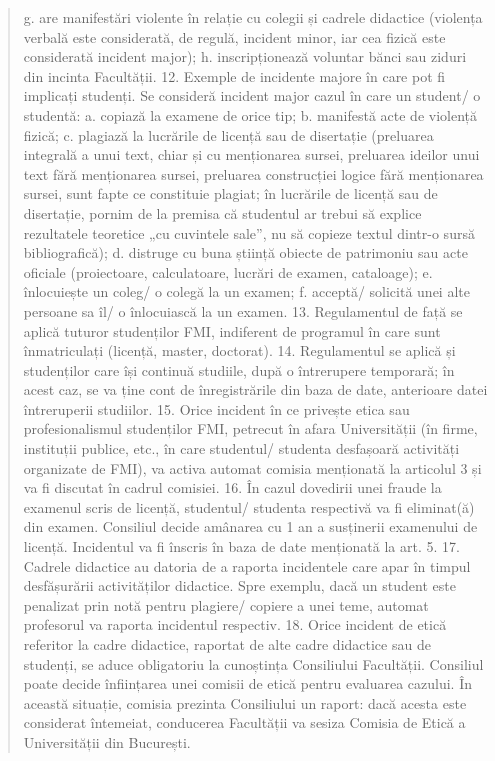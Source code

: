\documentclass{article}
\begin{document}
\begin{quote}
g. are manifestări violente în relație cu colegii și cadrele didactice (violența verbală este
considerată, de regulă, incident minor, iar cea fizică este considerată incident major);
h. inscripționează voluntar bănci sau ziduri din incinta Facultății.
12. Exemple de incidente majore în care pot fi implicați studenți.
Se consideră incident major cazul în care un student/ o studentă:
a. copiază la examene de orice tip;
b. manifestă acte de violență fizică;
c. plagiază la lucrările de licență sau de disertație (preluarea integrală a unui text, chiar
și cu menționarea sursei, preluarea ideilor unui text fără menționarea sursei,
preluarea construcției logice fără menționarea sursei, sunt fapte ce constituie plagiat;
în lucrările de licență sau de disertație, pornim de la premisa că studentul ar trebui să
explice rezultatele teoretice „cu cuvintele sale”, nu să copieze textul dintr-o sursă
bibliografică);
d. distruge cu buna știință obiecte de patrimoniu sau acte oficiale (proiectoare,
calculatoare, lucrări de examen, cataloage);
e. înlocuiește un coleg/ o colegă la un examen;
f. acceptă/ solicită unei alte persoane sa îl/ o înlocuiască la un examen.
13. Regulamentul de față se aplică tuturor studenților FMI, indiferent de programul în
care sunt înmatriculați (licență, master, doctorat).
14. Regulamentul se aplică și studenților care își continuă studiile, după o întrerupere
temporară; în acest caz, se va ține cont de înregistrările din baza de date, anterioare
datei întreruperii studiilor.
15. Orice incident în ce privește etica sau profesionalismul studenților FMI, petrecut în
afara Universității (în firme, instituții publice, etc., în care studentul/ studenta
desfașoară activități organizate de FMI), va activa automat comisia menționată la
articolul 3 și va fi discutat în cadrul comisiei.
16. În cazul dovedirii unei fraude la examenul scris de licență, studentul/ studenta
respectivă va fi eliminat(ă) din examen. Consiliul decide amânarea cu 1 an a
susținerii examenului de licență. Incidentul va fi înscris în baza de date menționată la
art. 5.
17. Cadrele didactice au datoria de a raporta incidentele care apar în timpul desfășurării
activităților didactice. Spre exemplu, dacă un student este penalizat prin notă pentru
plagiere/ copiere a unei teme, automat profesorul va raporta incidentul respectiv.
18. Orice incident de etică referitor la cadre didactice, raportat de alte cadre didactice
sau de studenți, se aduce obligatoriu la cunoștința Consiliului Facultății. Consiliul
poate decide înființarea unei comisii de etică pentru evaluarea cazului. În această
situație, comisia prezinta Consiliului un raport: dacă acesta este considerat întemeiat,
conducerea Facultății va sesiza Comisia de Etică a Universității din București. 

\end{quote}
\end{document}
